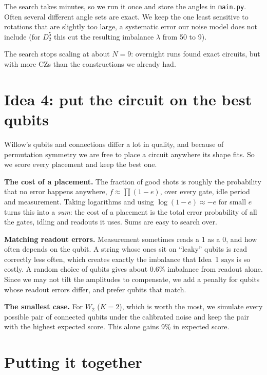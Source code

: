 \documentclass[11pt]{scrartcl}
\newcommand{\D}[2]{D^{#1}_{#2}}
\newcommand{\file}[1]{\texttt{\small #1}}
\begin{document}
The search takes minutes, so we run it once and store the angles in \file{main.py}. Often several
different angle sets are exact. We keep the one least sensitive to rotations that are slightly too
large, a systematic error our noise model does not include (for $\D52$ this cut the resulting
imbalance $\lambda$ from 50 to 9).

The search stops scaling at about $N=9$: overnight runs found exact circuits, but with more CZs than
the constructions we already had.

\section{Idea 4: put the circuit on the best qubits}

Willow's qubits and connections differ a lot in quality, and because of permutation symmetry we are
free to place a circuit anywhere its shape fits. So we score every placement and keep the best one.

\textbf{The cost of a placement.} The fraction of good shots is roughly the probability that no
error happens anywhere, $f\approx\prod(1-e)$, over every gate, idle period and measurement. Taking
logarithms and using $\log(1-e)\approx-e$ for small $e$ turns this into a \emph{sum}: the cost of a
placement is the total error probability of all the gates, idling and readouts it uses. Sums are easy
to search over.

\textbf{Matching readout errors.} Measurement sometimes reads a 1 as a 0, and how often depends on
the qubit. A string whose ones sit on ``leaky'' qubits is read correctly less often, which creates
exactly the imbalance that Idea~1 says is so costly. A random choice of qubits gives about 0.6\%
imbalance from readout alone. Since we may not tilt the amplitudes to compensate, we add a penalty
for qubits whose readout errors differ, and prefer qubits that match.

\textbf{The smallest case.} For $W_2$ ($K=2$), which is worth the most, we simulate every possible
pair of connected qubits under the calibrated noise and keep the pair with the highest expected
score. This alone gains 9\% in expected score.

\section{Putting it together}
\end{document}
